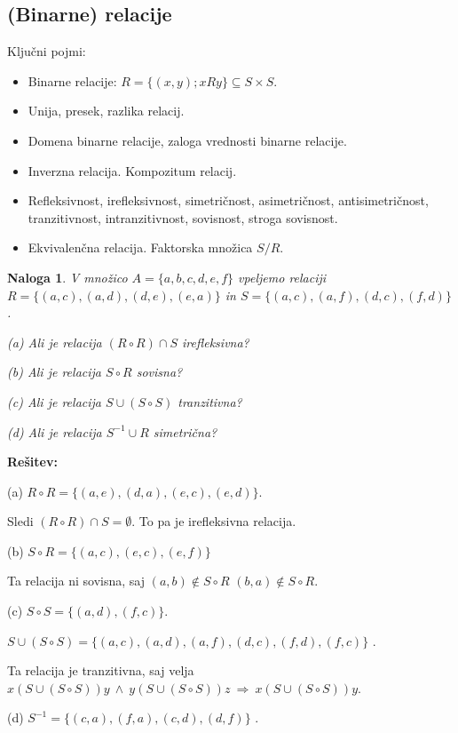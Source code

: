 \documentclass[11pt,paper=b5,footinclude,headinclude]{scrbook} %
\def\inn {{~\wedge~}}
\def\sledi {{~\Rightarrow~}}
\newtheorem*{problem}{Naloga}
\begin{document}
\subsection{(Binarne) relacije}

Ključni pojmi:
\begin{itemize}
  \item Binarne relacije:
  $R = \{(x,y) ; xRy \}\subseteq S\times S$.
  \item Unija, presek, razlika relacij.
  \item Domena binarne relacije, zaloga vrednosti binarne relacije.
  \item Inverzna relacija. Kompozitum relacij.
\item Refleksivnost, irefleksivnost, simetričnost, asimetričnost, antisimetričnost, tranzitivnost, intranzitivnost,
sovisnost, stroga sovisnost.
\item Ekvivalenčna relacija. Faktorska množica $S/R$.
\end{itemize}

\begin{problem}
V množico $A = \{a, b, c, d, e, f \}$ vpeljemo relaciji
$R = \{(a, c), (a, d), (d, e), (e, a)\}$ in
$S = \{(a, c), (a, f), (d, c), (f, d)\}$ .

(a) Ali je relacija $(R\circ R)\cap S$ irefleksivna?

(b) Ali je relacija $S\circ R$ sovisna?

(c) Ali je relacija $S\cup (S\circ S)$ tranzitivna?

(d) Ali je relacija $S^{-1}\cup R$ simetrična?
\end{problem}

\textbf{Rešitev:}

(a)
$R\circ R = \{(a,e), (d,a), (e,c), (e,d)\}$.

Sledi
$(R\circ R)\cap S = \emptyset$. To pa je irefleksivna relacija.

(b) $S\circ R = \{(a,c), (e,c), (e,f)\}$

Ta relacija ni sovisna, saj $(a,b)\not\in S\circ R$
$(b,a)\not\in S\circ R$.

(c)
$S\circ S = \{(a,d), (f,c)\}$.

$S\cup (S\circ S)= \{(a, c), (a,d), (a, f), (d, c), (f, d), (f,c)\}$ .

Ta relacija je tranzitivna, saj velja $x(S\cup (S\circ S))y\inn
y(S\cup (S\circ S))z\sledi x(S\cup (S\circ S))y$.

(d)
$S^{-1} = \{(c, a), (f, a), (c, d), (d, f)\}$ .
\end{document}
